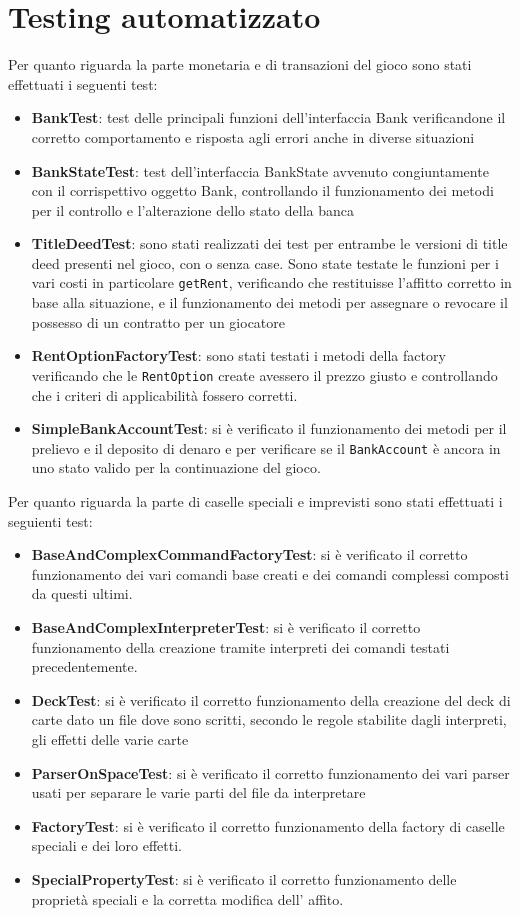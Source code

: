 \section{Testing automatizzato}
Per quanto riguarda la parte monetaria e di transazioni del gioco sono stati effettuati i seguenti test:\newline
\begin{itemize}
    \item \textbf{BankTest}: test delle principali funzioni dell'interfaccia Bank verificandone il corretto comportamento e risposta agli errori anche in diverse situazioni
    \item \textbf{BankStateTest}: test dell'interfaccia BankState avvenuto congiuntamente con il corrispettivo oggetto Bank, controllando il funzionamento dei metodi per il controllo e l'alterazione dello stato della banca 
    \item \textbf{TitleDeedTest}: sono stati realizzati dei test per entrambe le versioni di title deed presenti nel gioco, con o senza case. Sono state testate le funzioni per i vari costi in particolare \texttt{getRent}, verificando che restituisse l'affitto corretto in base alla situazione, e il funzionamento dei metodi per assegnare o revocare il possesso di un contratto per un giocatore
    \item \textbf{RentOptionFactoryTest}: sono stati testati i metodi della factory verificando che le \texttt{RentOption} create avessero il prezzo giusto e controllando che i criteri di applicabilità fossero corretti.
    \item \textbf{SimpleBankAccountTest}: si è verificato il funzionamento dei metodi per il prelievo e il deposito di denaro e per verificare se il \texttt{BankAccount} è ancora in uno stato valido per la continuazione del gioco.  
\end{itemize}
Per quanto riguarda la parte di caselle speciali e imprevisti sono stati effettuati i seguienti test:\newline
\begin{itemize}
    \item \textbf{BaseAndComplexCommandFactoryTest}: si è verificato il corretto funzionamento dei vari comandi base creati e dei comandi complessi composti da questi ultimi.
    \item \textbf{BaseAndComplexInterpreterTest}: si è verificato il corretto funzionamento della creazione tramite interpreti dei comandi testati precedentemente.
    \item \textbf{DeckTest}: si è verificato il corretto funzionamento della creazione del deck di carte dato un file dove sono scritti, secondo le regole stabilite dagli interpreti, gli effetti delle varie carte
    \item \textbf{ParserOnSpaceTest}: si è verificato il corretto funzionamento dei vari parser usati per separare le varie parti del file da interpretare
    \item \textbf{FactoryTest}: si è verificato il corretto funzionamento della factory di caselle speciali e dei loro effetti. 
    \item \textbf{SpecialPropertyTest}: si è verificato il corretto funzionamento delle proprietà speciali e la corretta modifica dell' affito.
\end{itemize}
